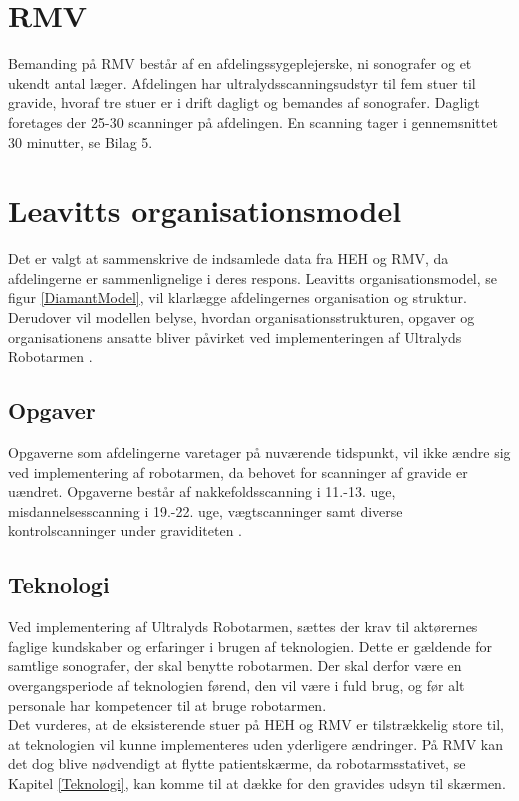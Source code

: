 \section{RMV}
Bemanding på RMV består af en afdelingssygeplejerske, ni sonografer og et ukendt antal læger. Afdelingen har ultralydsscanningsudstyr til fem stuer til gravide, hvoraf tre stuer er i drift dagligt og bemandes af sonografer. Dagligt foretages der 25-30 scanninger på afdelingen. En scanning tager i gennemsnittet 30 minutter, se Bilag 5.

\section{Leavitts organisationsmodel}
Det er valgt at sammenskrive de indsamlede data fra HEH og RMV, da afdelingerne er sammenlignelige i deres respons. Leavitts organisationsmodel, se figur \ref*{DiamantModel}, vil klarlægge afdelingernes organisation og struktur. Derudover vil modellen belyse, hvordan organisationsstrukturen, opgaver og organisationens ansatte bliver påvirket ved implementeringen af Ultralyds Robotarmen \cite{Leavitt}\cite{diamantmodel}. 

\subsection{Opgaver}
Opgaverne som afdelingerne varetager på nuværende tidspunkt, vil ikke ændre sig ved implementering af robotarmen, da behovet for scanninger af gravide er uændret. Opgaverne består af nakkefoldsscanning i 11.-13. uge, misdannelsesscanning i 19.-22. uge, vægtscanninger samt diverse kontrolscanninger under graviditeten \cite{graviditet}.

\subsection{Teknologi}
Ved implementering af Ultralyds Robotarmen, sættes der krav til aktørernes faglige kundskaber og erfaringer i brugen af teknologien. Dette er gældende for samtlige sonografer, der skal benytte robotarmen. Der skal derfor være en overgangsperiode af teknologien førend, den vil være i fuld brug, og før alt personale har kompetencer til at bruge robotarmen. \\
Det vurderes, at de eksisterende stuer på HEH og RMV er tilstrækkelig store til, at teknologien vil kunne implementeres uden yderligere ændringer. På RMV kan det dog blive nødvendigt at flytte patientskærme, da robotarmsstativet, se Kapitel \ref{Teknologi}, kan komme til at dække for den gravides udsyn til skærmen.  

